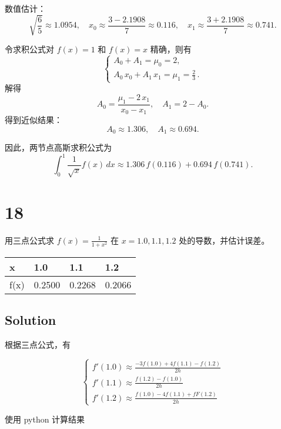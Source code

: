 \documentclass[11pt]{article}
\begin{document}
数值估计： \[
\sqrt{\frac{6}{5}}\approx 1.0954,\quad x_0\approx\frac{3-2.1908}{7}\approx 0.116,\quad
x_1\approx\frac{3+2.1908}{7}\approx 0.741.
\]

令求积公式对 \(f(x)=1\) 和 \(f(x)=x\) 精确，则有 \[
\begin{cases}
A_0+A_1=\mu_0=2,\\[1mm]
A_0\,x_0+A_1\,x_1=\mu_1=\frac{2}{3}\,.
\end{cases}
\] 解得 \[
A_0=\frac{\mu_1-2\,x_1}{x_0-x_1},\quad A_1=2-A_0.
\] 得到近似结果： \[
A_0\approx 1.306,\quad A_1\approx 0.694.
\]

因此，两节点高斯求积公式为 \[\boxed{
\int_0^1 \frac{1}{\sqrt{x}}f(x)\,dx \approx 1.306\,f(0.116)+0.694\,f(0.741).}
\]

    \section{18}\label{section}

用三点公式求 \(f(x) = \frac{1}{1 + x^2}\) 在 \(x = 1.0, 1.1, 1.2\)
处的导数，并估计误差。

\begin{longtable}[]{@{}llll@{}}
\toprule\noalign{}
x & 1.0 & 1.1 & 1.2 \\
\midrule\noalign{}
\endhead
\bottomrule\noalign{}
\endlastfoot
f(x) & 0.2500 & 0.2268 & 0.2066 \\
\end{longtable}

    \subsection{Solution}\label{solution}

根据三点公式，有

\[
\begin{cases}
f'(1.0)\approx \frac{-3f(1.0)+4f(1.1)-f(1.2)}{2h} \\
f'(1.1)\approx \frac{f(1.2)-f(1.0)}{2h} \\
f'(1.2)\approx \frac{f(1.0)-4f(1.1)+fF(1.2)}{2h}
\end{cases}
\]

使用 python 计算结果
\end{document}
